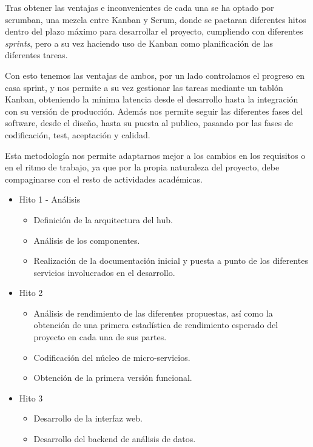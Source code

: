 \documentclass{pre-tfg}
\begin{document}
Tras obtener las ventajas e inconvenientes de cada una se ha optado por scrumban, una
mezcla entre Kanban y Scrum, donde se pactaran diferentes hitos dentro del plazo máximo
para desarrollar el proyecto, cumpliendo con diferentes \emph{sprints}, pero a su vez
haciendo uso de Kanban como planificación de las diferentes tareas.

Con esto tenemos las ventajas de ambos, por un lado controlamos el progreso en casa
sprint, y nos permite a su vez gestionar las tareas mediante un tablón Kanban, obteniendo
la mínima latencia desde el desarrollo hasta la integración con su versión de
producción. Además nos permite seguir las diferentes fases del software, desde el diseño,
hasta su puesta al publico, pasando por las fases de codificación, test, aceptación y
calidad.

Esta metodología nos permite adaptarnos mejor a los cambios en los requisitos o en el ritmo
de trabajo, ya que por la propia naturaleza del proyecto, debe compaginarse con el resto de
actividades académicas.

\begin{itemize}
\item Hito 1 - Análisis
  \begin{itemize}
  \item Definición de la arquitectura del hub.
  \item Análisis de los componentes.
  \item Realización de la documentación inicial y puesta a punto de los
    diferentes servicios involucrados en el desarrollo.
  \end{itemize}

\item Hito 2
  \begin{itemize}
  \item Análisis de rendimiento de las diferentes propuestas, así como la
    obtención de una primera estadística de rendimiento esperado del proyecto en cada
    una de sus partes.
  \item Codificación del núcleo de micro-servicios.
  \item Obtención de la primera versión funcional.
  \end{itemize}

\item Hito 3
  \begin{itemize}
  \item Desarrollo de la interfaz web.
  \item Desarrollo del backend de análisis de datos.
  \end{itemize}
\end{itemize}
\end{document}
